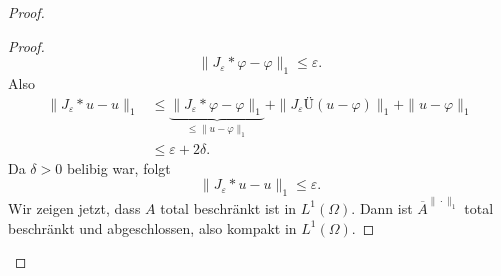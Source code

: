 \documentclass[
paper=a4,
bibtotocnumbered,
liststotocnumbered,
tablecaptionabove,
pointlessnumbers,
twoside,
openright,
10pt
]
{report}
\let\phi\varphi
\theoremstyle{definition}
\numberwithin{equation}{chapter}
\begin{document}
\begin{proof}
\begin{proof}
\begin{equation}
 \|J_\varepsilon* \phi - \phi \|_1 \le \varepsilon.
\end{equation}
Also 
\begin{align*}
 \| J_\varepsilon*u -u\|_1 &\le \underbrace{\|J_\varepsilon * \phi - \phi\|_1}_{\le \|u-\phi\|_1} + \| J_\varepsilon Ü (u-\phi)\|_1 + \| u-\phi\|_1\\
 &\le \varepsilon + 2\delta.
\end{align*}
Da $\delta >0$ belibig war, folgt
\begin{equation}
 \| J_\varepsilon * u - u \|_1 \le \varepsilon.
\end{equation}
Wir zeigen jetzt, dass $A$ total beschränkt ist in $L^1(\Omega)$. Dann ist $\overline{A}^{\|\cdot\|_1}$ total beschränkt und abgeschlossen, also kompakt in $L^1(\Omega)$.


\end{proof}
\end{proof}
\end{document}
